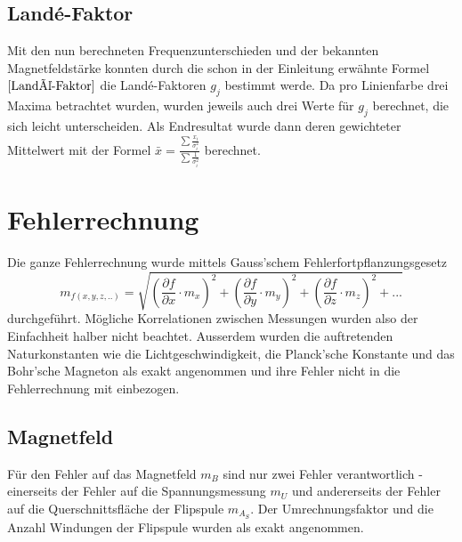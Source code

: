 \documentclass[a4paper,parskip,11pt, DIV12]{scrreprt}
\begin{document}
	\section{Landé-Faktor}
	
	Mit den nun berechneten Frequenzunterschieden und der bekannten Magnetfeldstärke konnten durch die schon in der Einleitung erwähnte Formel $\eqref{Landé-Faktor}$ die Landé-Faktoren $g_j$ bestimmt werde. Da pro Linienfarbe drei Maxima betrachtet wurden, wurden jeweils auch drei Werte für $g_j$ berechnet, die sich leicht unterscheiden. Als Endresultat wurde dann deren gewichteter Mittelwert mit der Formel  $\bar{x} = \frac{\sum\frac{x_i}{\sigma_i^2}}{\sum \frac{1}{\sigma_i^2}}$ berechnet. 
 
	 
	\chapter{Fehlerrechnung}
	Die ganze Fehlerrechnung wurde mittels Gauss'schem Fehlerfortpflanzungsgesetz 
	\begin{equation}
	\label{Fehlerfortpflanzungsgesetz}
	m_{f(x,y,z,..)} = \sqrt{(\frac{\partial f}{\partial x} \cdot m_x)^2+(\frac{\partial f}{\partial y} \cdot m_y)^2+(\frac{\partial f}{\partial z} \cdot m_z)^2+...}
	\end{equation}
	durchgeführt. Mögliche Korrelationen zwischen Messungen wurden also der Einfachheit halber nicht beachtet. Ausserdem wurden die auftretenden Naturkonstanten wie die Lichtgeschwindigkeit, die Planck'sche Konstante und das Bohr'sche Magneton als exakt angenommen und ihre Fehler nicht in die Fehlerrechnung mit einbezogen.  
	\section{Magnetfeld}
	Für den Fehler auf das Magnetfeld $m_B$ sind nur zwei Fehler verantwortlich - einerseits der Fehler auf die Spannungsmessung $m_U$ und andererseits der Fehler auf die Querschnittsfläche der Flipspule $m_{A_S}$. Der Umrechnungsfaktor und die Anzahl Windungen der Flipspule wurden als exakt angenommen. 
	
\end{document}
